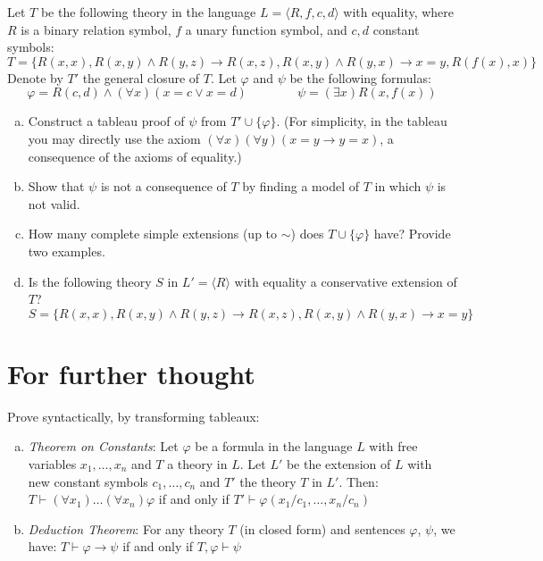 \begin{problem} 

    Let $T$ be the following theory in the language $L=\langle R,f,c,d\rangle$ with equality, where $R$ is a binary relation symbol, $f$ a unary function symbol, and $c,d$ constant symbols:
    $$
    T=\{R(x,x),R(x,y)\wedge R(y,z)\to R(x,z),R(x,y)\wedge R(y,x)\to x=y,R(f(x),x)\}
    $$
    Denote by $T'$ the general closure of $T$. Let $\varphi$ and $\psi$ be the following formulas:
    $$
    \varphi = R(c,d) \wedge (\forall x)(x=c\vee x=d)\qquad\qquad
    \psi = (\exists x)R(x,f(x))
    $$
    \begin{enumerate}[(a)]
        \item Construct a tableau proof of $\psi$ from $T'\cup\{\varphi\}$. (For simplicity, in the tableau you may directly use the axiom $(\forall x)(\forall y)(x=y\to y=x)$, a consequence of the axioms of equality.)
        \item Show that $\psi$ is not a consequence of $T$ by finding a model of $T$ in which $\psi$ is not valid.
        \item How many complete simple extensions (up to $\sim$) does $T\cup \{\varphi\}$ have? Provide two examples.
        \item Is the following theory $S$ in $L'=\langle R\rangle$ with equality a conservative extension of $T$?
        $$S=\{R(x,x),R(x,y)\wedge R(y,z)\to R(x,z),R(x,y)\wedge R(y,x)\to x=y\}$$     
    \end{enumerate}

\end{problem}


\section*{For further thought}


\begin{problem} 
    
    Prove syntactically, by transforming tableaux:
    \begin{enumerate}[(a)]
        \item \emph{Theorem on Constants}: Let $\varphi$ be a formula in the language $L$ with free variables $x_1,\dots,x_n$ and $T$ a theory in $L$. Let $L'$ be the extension of $L$ with new constant symbols $c_1,\dots,c_n$ and $T'$ the theory $T$ in $L'$. Then:
        $T \vdash (\forall x_1)\dots(\forall x_n)\varphi$ if and only if $T'\vdash\varphi(x_1/c_1,\dots,x_n/c_n)$
        \item \emph{Deduction Theorem}: For any theory $T$ (in closed form) and sentences $\varphi$, $\psi$, we have: $T\vdash \varphi\to\psi$ if and only if $T,\varphi\vdash\psi$
    \end{enumerate}

\end{problem}



